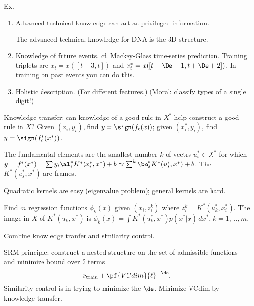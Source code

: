 Ex. 
\begin{enumerate}
\item
Advanced technical knowledge can act as privileged information. 

The advanced technical knowledge for DNA is the 3D structure.
\item 
Knowledge of future events. cf. Mackey-Glass time-series prediction. Training triplets are $x_t=x([t-3,t])$ and $x_t^*=x([t-\De-1,t+\De+2])$. In training on past events you can do this.
\item
Holistic description. (For different features.)
(Moral: classify types of a single digit!)
\end{enumerate}

Knowledge transfer: can knowledge of a good rule in $X^*$ help construct a good rule in $X$? Given $(x_i,y_i)$, find $y=\sign(f_\ell(x))$; given $(x_i^*,y_i)$, find $y=\sign(f_\ell^*(x^*))$.

The fundamental elements are the smallest number $k$ of vectrs $u_i^*\in X^*$ for which $y=f^*(x^*)=\sum y_i\al_i^*K^*(x_i^*,x^*)+b\approx \sum^k \be_s^* K^*(u_s^*,x^*)+b$. %
The $K^*(u_s^*,x^*)$ are frames.

Quadratic kernels are easy (eigenvalue problem); general kernels are hard. %

Find $m$ regression functions $\phi_k(x)$ given $(x_i,z_i^k)$ where $z_i^k=K^*(u_k^*,x_i^*)$.
The image in $X$ of $K^*(u_k,x^*)$ is $\phi_k(x)=\int K^*(u_k^*,x^*)p(x^*|x)\,dx^*$, $k=1,\ldots, m$.

Combine knowledge tranfer and similarity control.

SRM principle: construct a nested structure on the set of admissible functions and minimize bound over 2 terms \[\nu_{\text{train}}+\pf{VCdim}{\ell}^{-\de}.\] Similarity control is in trying to minimize the $\de$. Minimize VCdim by knowledge transfer.


